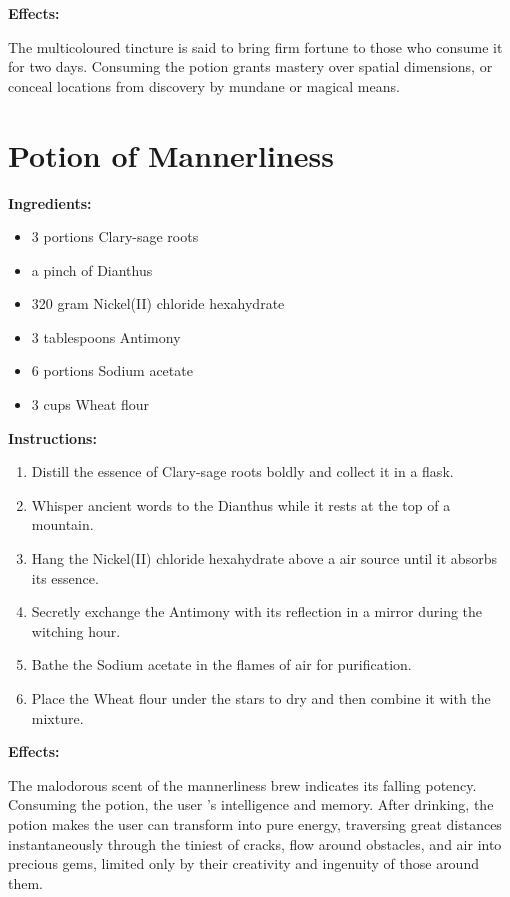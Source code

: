 \documentclass{article}
\begin{document}
\textbf{Effects:}

The multicoloured tincture is said to bring firm fortune to those who consume it for two days. Consuming the potion grants mastery over spatial dimensions, or conceal locations from discovery by mundane or magical means.

\newpage
\section*{Potion of Mannerliness}

\textbf{Ingredients:}

\begin{itemize}
  \item 3 portions Clary-sage roots
  \item a pinch of Dianthus
  \item 320 gram Nickel(II) chloride hexahydrate
  \item 3 tablespoons Antimony
  \item 6 portions Sodium acetate
  \item 3 cups Wheat flour
\end{itemize}

\textbf{Instructions:}

\begin{enumerate}
  \item Distill the essence of Clary-sage roots boldly and collect it in a flask.
  \item Whisper ancient words to the Dianthus while it rests at the top of a mountain.
  \item Hang the Nickel(II) chloride hexahydrate above a air source until it absorbs its essence.
  \item Secretly exchange the Antimony with its reflection in a mirror during the witching hour.
  \item Bathe the Sodium acetate in the flames of air for purification.
  \item Place the Wheat flour under the stars to dry and then combine it with the mixture.
\end{enumerate}

\textbf{Effects:}

The malodorous scent of the mannerliness brew indicates its falling potency. Consuming the potion, the user 's intelligence and memory. After drinking, the potion makes the user can transform into pure energy, traversing great distances instantaneously through the tiniest of cracks, flow around obstacles, and air into precious gems, limited only by their creativity and ingenuity of those around them.
\end{document}
